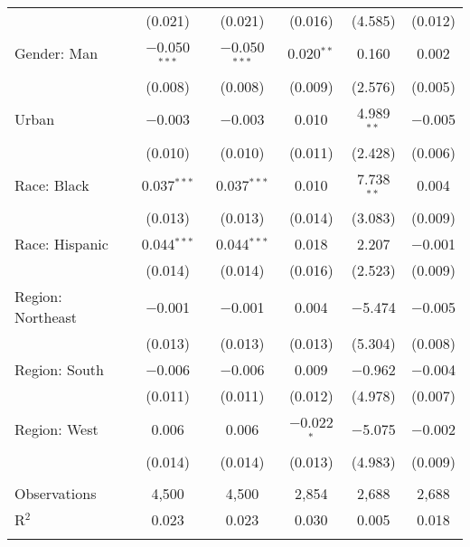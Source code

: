 \begin{tabular}{@{\extracolsep{5pt}}lccccc}
  & (0.021) & (0.021) & (0.016) & (4.585) & (0.012) \\ 
  Gender: Man & $-$0.050$^{***}$ & $-$0.050$^{***}$ & 0.020$^{**}$ & 0.160 & 0.002 \\ 
  & (0.008) & (0.008) & (0.009) & (2.576) & (0.005) \\ 
  Urban & $-$0.003 & $-$0.003 & 0.010 & 4.989$^{**}$ & $-$0.005 \\ 
  & (0.010) & (0.010) & (0.011) & (2.428) & (0.006) \\ 
  Race: Black & 0.037$^{***}$ & 0.037$^{***}$ & 0.010 & 7.738$^{**}$ & 0.004 \\ 
  & (0.013) & (0.013) & (0.014) & (3.083) & (0.009) \\ 
  Race: Hispanic & 0.044$^{***}$ & 0.044$^{***}$ & 0.018 & 2.207 & $-$0.001 \\ 
  & (0.014) & (0.014) & (0.016) & (2.523) & (0.009) \\ 
  Region: Northeast & $-$0.001 & $-$0.001 & 0.004 & $-$5.474 & $-$0.005 \\ 
  & (0.013) & (0.013) & (0.013) & (5.304) & (0.008) \\ 
  Region: South & $-$0.006 & $-$0.006 & 0.009 & $-$0.962 & $-$0.004 \\ 
  & (0.011) & (0.011) & (0.012) & (4.978) & (0.007) \\ 
  Region: West & 0.006 & 0.006 & $-$0.022$^{*}$ & $-$5.075 & $-$0.002 \\ 
  & (0.014) & (0.014) & (0.013) & (4.983) & (0.009) \\ 
 \hline \\[-1.8ex] 

Observations & 4,500 & 4,500 & 2,854 & 2,688 & 2,688 \\ 
R$^{2}$ & 0.023 & 0.023 & 0.030 & 0.005 & 0.018 \\ 
\hline 
\hline \\[-1.8ex] 
\end{tabular} 